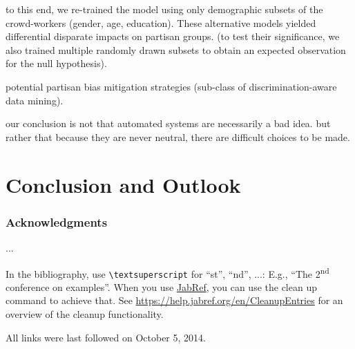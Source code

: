\documentclass[runningheads,a4paper]{llncs}
\begin{document}
to this end, we re-trained the model using only demographic subsets of the crowd-workers (gender, age, education). These alternative models yielded differential disparate impacts on partisan groups. (to test their significance, we also trained multiple randomly drawn subsets to obtain an expected observation for the null hypothesis).

potential partisan bias mitigation strategies (sub-class of discrimination-aware data mining).

our conclusion is not that automated systems are necessarily a bad idea. but rather that because they are never neutral, there are difficult choices to be made.


\section{Conclusion and Outlook}

\subsubsection*{Acknowledgments}
...

In the bibliography, use \texttt{\textbackslash textsuperscript} for ``st'', ``nd'', ...:
E.g., \enquote{The 2\textsuperscript{nd} conference on examples}.
When you use \href{https://www.jabref.org}{JabRef}, you can use the clean up command to achieve that.
See \url{https://help.jabref.org/en/CleanupEntries} for an overview of the cleanup functionality.




All links were last followed on October 5, 2014.
\end{document}
